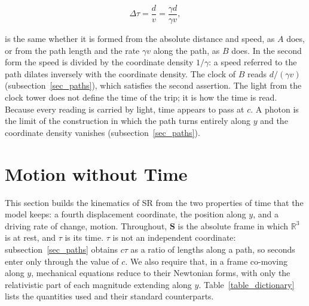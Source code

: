 \documentclass[anonymous]{iopjournal}
\begin{document}
\begin{equation}\label{eq_lighthouse_time}
    \Delta\tau=\frac{d}{v}=\frac{\gamma d}{\gamma v},
\end{equation}

is the same whether it is formed from the absolute distance and speed, as $A$ does, or from the path length and the rate $\gamma v$ along the path, as $B$ does. In the second form the speed is divided by the coordinate density $1/\gamma$: a speed referred to the path dilates inversely with the coordinate density. The clock of $B$ reads $d/(\gamma v)$ (subsection~\ref{sec_paths}), which satisfies the second assertion. The light from the clock tower does not define the time of the trip; it is how the time is read. Because every reading is carried by light, time appears to pass at $c$. A photon is the limit of the construction in which the path turns entirely along $y$ and the coordinate density vanishes (subsection~\ref{sec_paths}).

\section{Motion without Time}\label{sec_motion}

This section builds the kinematics of SR from the two properties of time that the model keeps: a fourth displacement coordinate, the position along $y$, and a driving rate of change, motion. Throughout, $\mathbf{S}$ is the absolute frame in which $\mathbb{R}^3$ is at rest, and $\tau$ is its time. $\tau$ is not an independent coordinate: subsection~\ref{sec_paths} obtains $c\tau$ as a ratio of lengths along a path, so seconds enter only through the value of $c$. We also require that, in a frame co-moving along $y$, mechanical equations reduce to their Newtonian forms, with only the relativistic part of each magnitude extending along $y$. Table~\ref{table_dictionary} lists the quantities used and their standard counterparts.
\end{document}

